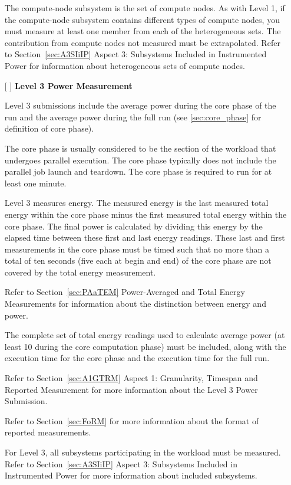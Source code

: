 \begin{itemize}
The compute-node subsystem is the set of compute nodes. As with Level 1, if the compute-node subsystem contains different types of compute nodes, you must measure at least one member from each of the heterogeneous sets. The contribution from compute nodes not measured must be extrapolated. Refer to Section~\ref{sec:A3SIiIP} Aspect 3: Subsystems Included in Instrumented Power for information about heterogeneous sets of compute nodes.

\newpage
\item[{[ ]}]
\textbf{Level 3 Power Measurement}

Level 3 submissions include the average power during the core phase of the run and the average power during the full run (see \ref{sec:core_phase} for definition of core phase).

The core phase is usually considered to be the section of the workload that undergoes parallel execution. The core phase typically does not include the parallel job launch and teardown.
The core phase is required to run for at least one minute.

Level 3 measures energy.
The measured energy is the last measured total energy within the core phase minus the first measured total energy within the core phase.
The final power is calculated by dividing this energy by the elapsed time between these first and last energy readings.
These last and first measurements in the core phase must be timed such that no more than a total of ten seconds (five each at begin and end) of the core phase are not covered by the total energy measurement.

Refer to Section~\ref{sec:PAaTEM} Power-Averaged and Total Energy Measurements for information about the distinction between energy and power.

The complete set of total energy readings used to calculate average power (at least 10 during the core computation phase) must be included, along with the execution time for the core phase and the execution time for the full run.

Refer to Section~\ref{sec:A1GTRM} Aspect 1: Granularity, Timespan and Reported Measurement for more 
information about the Level 3 Power Submission.

Refer to Section~\ref{sec:FoRM} for more information about the format of reported measurements.

For Level 3, all subsystems participating in the workload must be measured. Refer to 
Section~\ref{sec:A3SIiIP} Aspect 3: Subsystems Included in Instrumented Power for more information about included subsystems.


\end{itemize}
